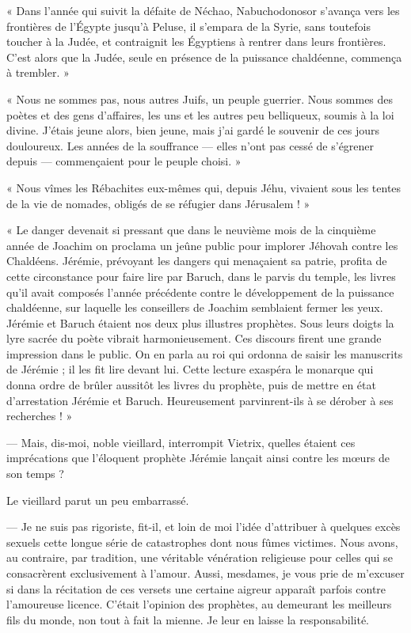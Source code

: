 \documentclass[a4paper, 11pt, oneside, polutonikogreek, french]{article}
\begin{document}
« Dans l'année qui suivit la défaite de Néchao, Nabuchodonosor s'avança vers les frontières de l'Égypte jusqu'à Peluse, il s'empara de la Syrie, sans toutefois toucher à la Judée, et contraignit les Égyptiens à rentrer dans leurs frontières. C'est alors que la Judée, seule en présence de la puissance chaldéenne, commença à trembler. »

\bigskip
\centerline{\EightStarTaper}
\centerline{\EightStarTaper\EightStarTaper}
\bigskip

« Nous ne sommes pas, nous autres Juifs, un peuple guerrier. Nous sommes des poètes et des gens d'affaires, les uns et les autres peu belliqueux, soumis à la loi divine. J'étais jeune alors, bien jeune, mais j'ai gardé le souvenir de ces jours douloureux. Les années de la souffrance --- elles n'ont pas cessé de s'égrener depuis --- commençaient pour le peuple choisi. »

« Nous vîmes les Rébachites eux-mêmes qui, depuis Jéhu, vivaient sous les tentes de la vie de nomades, obligés de se réfugier dans Jérusalem ! »

« Le danger devenait si pressant que dans le neuvième mois de la cinquième année de Joachim on proclama un jeûne public pour implorer Jéhovah contre les Chaldéens. Jérémie, prévoyant les dangers qui menaçaient sa patrie, profita de cette circonstance pour faire lire par Baruch, dans le parvis du temple, les livres qu'il avait composés l'année précédente contre le développement de la puissance chaldéenne, sur laquelle les conseillers de Joachim semblaient fermer les yeux. Jérémie et Baruch étaient nos deux plus illustres prophètes. Sous leurs doigts la lyre sacrée du poète vibrait harmonieusement. Ces discours firent une grande impression dans le public. On en parla au roi qui ordonna de saisir les manuscrits de Jérémie ; il les fit lire devant lui. Cette lecture exaspéra le monarque qui donna ordre de brûler aussitôt les livres du prophète, puis de mettre en état d'arrestation Jérémie et Baruch. Heureusement parvinrent-ils à se dérober à ses recherches ! »

\bigskip
\centerline{\EightStarTaper}
\centerline{\EightStarTaper\EightStarTaper}
\bigskip

--- Mais, dis-moi, noble vieillard, interrompit Vietrix, quelles étaient ces imprécations que l'éloquent prophète Jérémie lançait ainsi contre les mœurs de son temps ?

Le vieillard parut un peu embarrassé.

--- Je ne suis pas rigoriste, fit-il, et loin de moi l'idée d'attribuer à quelques excès sexuels cette longue série de catastrophes dont nous fûmes victimes. Nous avons, au contraire, par tradition, une véritable vénération religieuse pour celles qui se consacrèrent exclusivement à l'amour. Aussi, mesdames, je vous prie de m'excuser si dans la récitation de ces versets une certaine aigreur apparaît parfois contre l'amoureuse licence. C'était l'opinion des prophètes, au demeurant les meilleurs fils du monde, non tout à fait la mienne. Je leur en laisse la responsabilité.
\end{document}
